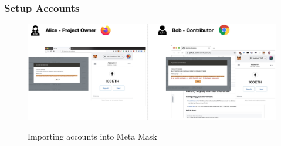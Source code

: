 \documentclass[12pt]{article}
\renewcommand{\_}{\kern-1.5pt\textunderscore\kern-1.5pt}
\begin{document}



\subsubsection{Setup Accounts}

\begin{figure}[H]
	\centering
	\includegraphics[width=16.5cm]{graphs/48. setup_3.png}\\
	\caption{Importing accounts into Meta Mask}
	\label{fig:setup5}
\end{figure}
\end{document}
